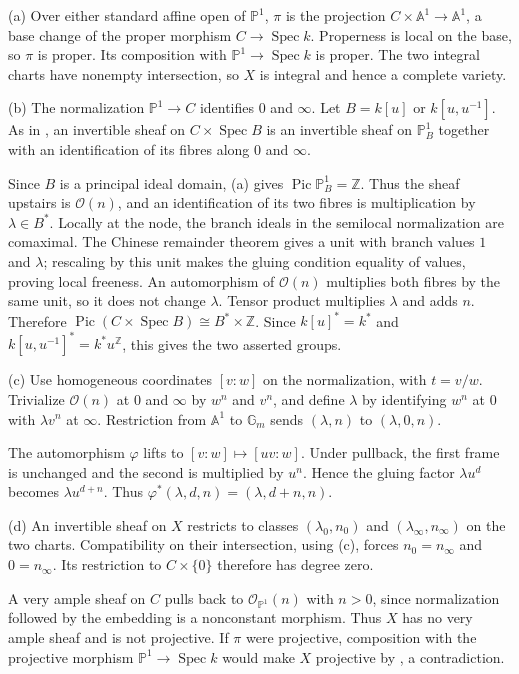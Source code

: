 (a) Over either standard affine open of $\mathbb P^1$, $\pi$ is the projection $C\times\mathbb A^1\to\mathbb A^1$, a base change of the proper morphism $C\to\operatorname{Spec}k$. Properness is local on the base, so $\pi$ is proper. Its composition with $\mathbb P^1\to\operatorname{Spec}k$ is proper. The two integral charts have nonempty intersection, so $X$ is integral and hence a complete variety.

(b) The normalization $\mathbb P^1\to C$ identifies $0$ and $\infty$. Let $B=k[u]$ or $k[u,u^{-1}]$. As in , an invertible sheaf on $C\times\operatorname{Spec}B$ is an invertible sheaf on $\mathbb P^1_B$ together with an identification of its fibres along $0$ and $\infty$.

Since $B$ is a principal ideal domain, (a) gives $\operatorname{Pic}\mathbb P^1_B=\mathbb Z$. Thus the sheaf upstairs is $\mathcal O(n)$, and an identification of its two fibres is multiplication by $\lambda\in B^*$. Locally at the node, the branch ideals in the semilocal normalization are comaximal. The Chinese remainder theorem gives a unit with branch values $1$ and $\lambda$; rescaling by this unit makes the gluing condition equality of values, proving local freeness. An automorphism of $\mathcal O(n)$ multiplies both fibres by the same unit, so it does not change $\lambda$. Tensor product multiplies $\lambda$ and adds $n$. Therefore $\operatorname{Pic}(C\times\operatorname{Spec}B)\cong B^*\times\mathbb Z$. Since $k[u]^*=k^*$ and $k[u,u^{-1}]^*=k^*u^{\mathbb Z}$, this gives the two asserted groups.

(c) Use homogeneous coordinates $[v:w]$ on the normalization, with $t=v/w$. Trivialize $\mathcal O(n)$ at $0$ and $\infty$ by $w^n$ and $v^n$, and define $\lambda$ by identifying $w^n$ at $0$ with $\lambda v^n$ at $\infty$. Restriction from $\mathbb A^1$ to $\mathbb G_m$ sends $(\lambda,n)$ to $(\lambda,0,n)$.

The automorphism $\varphi$ lifts to $[v:w]\mapsto[uv:w]$. Under pullback, the first frame is unchanged and the second is multiplied by $u^n$. Hence the gluing factor $\lambda u^d$ becomes $\lambda u^{d+n}$. Thus $\varphi^*(\lambda,d,n)=(\lambda,d+n,n)$.

(d) An invertible sheaf on $X$ restricts to classes $(\lambda_0,n_0)$ and $(\lambda_\infty,n_\infty)$ on the two charts. Compatibility on their intersection, using (c), forces $n_0=n_\infty$ and $0=n_\infty$. Its restriction to $C\times\{0\}$ therefore has degree zero.

A very ample sheaf on $C$ pulls back to $\mathcal O_{\mathbb P^1}(n)$ with $n>0$, since normalization followed by the embedding is a nonconstant morphism. Thus $X$ has no very ample sheaf and is not projective. If $\pi$ were projective, composition with the projective morphism $\mathbb P^1\to\operatorname{Spec}k$ would make $X$ projective by , a contradiction.
